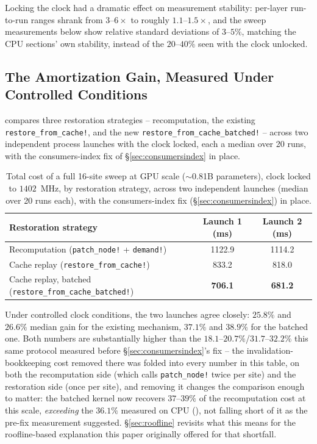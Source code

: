 \documentclass{article}
\begin{document}
Locking the clock had a dramatic effect on measurement stability: per-layer run-to-run ranges
shrank from $3$--$6\times$ to roughly $1.1$--$1.5\times$, and the sweep measurements below show
relative standard deviations of $3$--$5\%$, matching the CPU sections' own stability, instead of
the $20$--$40\%$ seen with the clock unlocked.

\subsection{The Amortization Gain, Measured Under Controlled Conditions}

 compares three restoration strategies -- recomputation, the existing
\texttt{restore\_from\_cache!}, and the new \texttt{restore\_from\_cache\_batched!} -- across two
independent process launches with the clock locked, each a median over 20 runs, with the
consumers-index fix of \S\ref{sec:consumersindex} in place.

\begin{table}[H]
\centering
\caption{Total cost of a full 16-site sweep at GPU scale ($\sim$0.81B parameters), clock locked to
$1402$~MHz, by restoration strategy, across two independent launches (median over 20 runs each),
with the consumers-index fix (\S\ref{sec:consumersindex}) in place.}
\label{tab:gpusweep}
\begin{tabular}{l c c}
\toprule
\textbf{Restoration strategy} & \textbf{Launch 1 (ms)} & \textbf{Launch 2 (ms)} \\
\midrule
Recomputation (\texttt{patch\_node!} + \texttt{demand!}) & 1122.9 & 1114.2 \\
\rowcolor{rowgray}
Cache replay (\texttt{restore\_from\_cache!}) & 833.2 & 818.0 \\
Cache replay, batched (\texttt{restore\_from\_cache\_batched!}) & \textbf{706.1} & \textbf{681.2} \\
\bottomrule
\end{tabular}
\end{table}

Under controlled clock conditions, the two launches agree closely: $25.8\%$ and $26.6\%$ median
gain for the existing mechanism, $37.1\%$ and $38.9\%$ for the batched one. Both numbers are
substantially higher than the $18.1$--$20.7\%$/$31.7$--$32.2\%$ this same protocol measured before
\S\ref{sec:consumersindex}'s fix -- the invalidation-bookkeeping cost removed there was folded into
every number in this table, on both the recomputation side (which calls \texttt{patch\_node!}
twice per site) and the restoration side (once per site), and removing it changes the comparison
enough to matter: the batched kernel now recovers $37$--$39\%$ of the recomputation cost at this
scale, \emph{exceeding} the $36.1\%$ measured on CPU (), not falling short of it as
the pre-fix measurement suggested. \S\ref{sec:roofline} revisits what this means for the
roofline-based explanation this paper originally offered for that shortfall.
\end{document}
